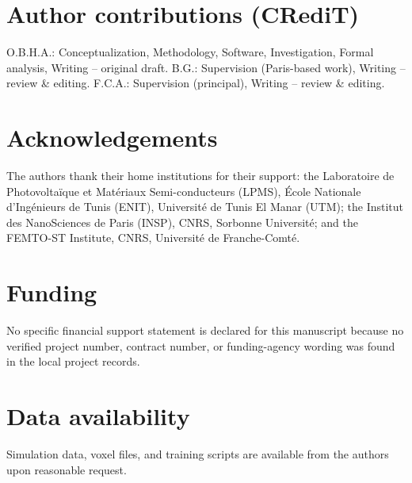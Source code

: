 \documentclass[aip,amsmath,amssymb,reprint]{revtex4-1}
\begin{document}
\section*{Author contributions (CRediT)}
O.B.H.A.: Conceptualization, Methodology, Software, Investigation, Formal analysis,
Writing -- original draft. B.G.: Supervision (Paris-based work), Writing -- review \&
editing. F.C.A.: Supervision (principal), Writing -- review \& editing.

\section*{Acknowledgements}
The authors thank their home institutions for their support:
the Laboratoire de Photovolta\"{i}que et Mat\'{e}riaux
Semi-conducteurs (LPMS), \'{E}cole Nationale d'Ing\'{e}nieurs de
Tunis (ENIT), Universit\'{e} de Tunis El Manar (UTM); the Institut
des NanoSciences de Paris (INSP), CNRS, Sorbonne Universit\'{e};
and the FEMTO-ST Institute, CNRS, Universit\'{e} de
Franche-Comt\'{e}.

\section*{Funding}
No specific financial support statement is declared for this manuscript
because no verified project number, contract number, or funding-agency
wording was found in the local project records.

\section*{Data availability}
Simulation data, voxel files, and training scripts are available
from the authors upon reasonable request.



\end{document}
